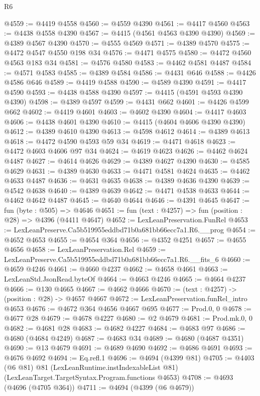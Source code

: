 \begin{lexlean}{R6}
\begin{coremodule}
@4559 := @4419 @4558
@4560 := @4559 @4390
@4561 := @4417 @4560
@4563 := @4438 @4558 @4390
@4567 := @4415 (@4561 @4563 @4390 @4390)
@4569 := @4389 @4567 @4390
@4570 := @4555 @4569
@4571 := @4389 @4570
@4575 := @4472 @4547 @4550 @198 @34
@4576 := @4471 @4575
@4580 := @4472 @4560 @4563 @183 @34
@4581 := @4576 @4580
@4583 := @4462 @4581 @4487
@4584 := @4571 @4583
@4585 := @4389 @4584
@4586 := @4431 @646
@4588 := @4426 @4586 @646
@4589 := @4419 @4588
@4590 := @4589 @4390
@4591 := @4417 @4590
@4593 := @4438 @4588 @4390
@4597 := @4415 (@4591 @4593 @4390 @4390)
@4598 := @4389 @4597
@4599 := @4431 @662
@4601 := @4426 @4599 @662
@4602 := @4419 @4601
@4603 := @4602 @4390
@4604 := @4417 @4603
@4606 := @4438 @4601 @4390
@4610 := @4415 (@4604 @4606 @4390 @4390)
@4612 := @4389 @4610 @4390
@4613 := @4598 @4612
@4614 := @4389 @4613
@4618 := @4472 @4590 @4593 @59 @34
@4619 := @4471 @4618
@4623 := @4472 @4603 @4606 @97 @34
@4624 := @4619 @4623
@4626 := @4462 @4624 @4487
@4627 := @4614 @4626
@4629 := @4389 @4627 @4390
@4630 := @4585 @4629
@4631 := @4389 @4630
@4633 := @4471 @4581 @4624
@4635 := @4462 @4633 @4487
@4636 := @4631 @4635
@4638 := @4389 @4636 @4390
@4639 := @4542 @4638
@4640 := @4389 @4639
@4642 := @4471 @4538 @4633
@4644 := @4462 @4642 @4487
@4645 := @4640 @4644
@4646 := @4391 @4645
@4647 := fun (byte : @505) => @4646
@4651 := fun (text : @4257) => fun (position : @28) => @4396 (@4411 @4647)
@4652 := LexLeanPreservation.FunRel
@4653 := LexLeanPreserve.Ca5b519955eddbd71b0a681bb66ecc7a1.R6.__prog
@4654 := @4652 @4653
@4655 := @4654 @364
@4656 := @4352 @4251
@4657 := @4655 @4656
@4658 := LexLeanPreservation.Rel
@4659 := LexLeanPreserve.Ca5b519955eddbd71b0a681bb66ecc7a1.R6.__fits_6
@4660 := @4659 @4246
@4661 := @4660 @4237
@4662 := @4658 @4661
@4663 := LexLeanStd.JsonRead.byteOf
@4664 := @4663 @4246
@4665 := @4664 @4237
@4666 := @130 @4665
@4667 := @4662 @4666
@4670 := (text : @4257) -> (position : @28) -> @4657 @4667
@4672 := LexLeanPreservation.funRel_intro @4653
@4676 := @4672 @364 @4656 @4667 @695
@4677 := Prod.{0, 0}
@4678 := @4677 @28
@4679 := @4678 @4227
@4680 := @2 @4679
@4681 := Prod.mk.{0, 0}
@4682 := @4681 @28
@4683 := @4682 @4227
@4684 := @4683 @97
@4686 := @4680 (@4684 @4249)
@4687 := @4683 @34
@4689 := @4680 (@4687 @4351)
@4690 := @13 @4679
@4691 := @4689 @4690
@4692 := @4686 @4691
@4693 := @4676 @4692
@4694 := Eq.refl.{1}
@4696 := @4694 (@4399 @81)
@4705 := @4403
    (@6 @81)
    @81
    (LexLeanRuntime.instIndexableList @81)
    (LexLeanTarget.TargetSyntax.Program.functions @4653)
@4708 := @4693 (@4696 (@4705 @364))
@4711 := @4694 (@4399 (@6 @4679))

\end{coremodule}
\end{lexlean}
